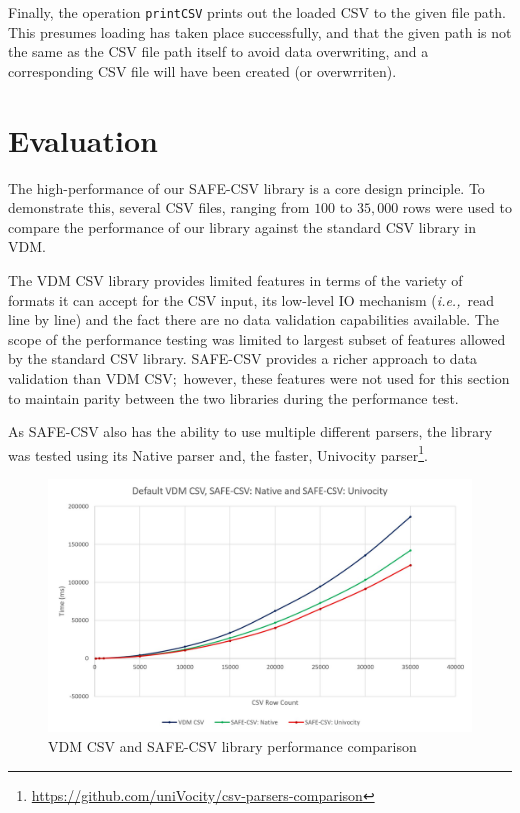 \documentclass[runningheads,a4paper]{llncs}
\begin{document}
Finally, the operation \texttt{printCSV} prints out the loaded CSV to the given file path. This presumes loading has taken place successfully, and that the given path is not the same as the CSV file path itself to avoid data overwriting, and a corresponding CSV file will have been created (or overwrriten).  

\section{Evaluation}\label{sec:Evaluation}

The high-performance of our SAFE-CSV library is a core design principle. To demonstrate this, several CSV files, ranging from \(100\) to \(35,000\) rows were used to compare the performance of our library against the standard CSV library in VDM.

The VDM CSV library provides limited features in terms of the variety of formats it can accept for the CSV input, its low-level IO mechanism (\textit{i.e.,}~read line by line) and the fact there are no data validation capabilities available. The scope of the performance testing was limited to largest subset of features allowed by the standard CSV library. SAFE-CSV provides a richer approach to data validation than VDM CSV;~however, these features were not used for this section to maintain parity between the two libraries during the performance test. 


As SAFE-CSV also has the ability to use multiple different parsers, the library was tested using its Native parser and, the faster, Univocity parser\footnote{\url{https://github.com/uniVocity/csv-parsers-comparison}}.

\begin{figure}[htbp]
    \centering
        \includegraphics[width=\textwidth]{figures/CSVPerformanceChart.jpg}
    \caption{VDM CSV and SAFE-CSV library performance comparison}\label{fig:CSVPerformanceChart}
 \end{figure}
\end{document}
